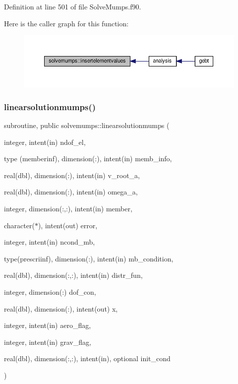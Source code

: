 Definition at line 501 of file Solve\+Mumps.\+f90.

Here is the caller graph for this function\+:\nopagebreak
\begin{figure}[H]
\begin{center}
\leavevmode
\includegraphics[width=350pt]{namespacesolvemumps_a3c8d285942de4048473a98c26d248fd7_icgraph}
\end{center}
\end{figure}
\mbox{\label{namespacesolvemumps_aad7849d30a944c0bd614bf4e103ef494}} 
\subsubsection{\texorpdfstring{linearsolutionmumps()}{linearsolutionmumps()}}
{\footnotesize\ttfamily subroutine, public solvemumps\+::linearsolutionmumps (\begin{DoxyParamCaption}\item[{integer, intent(in)}]{ndof\+\_\+el,  }\item[{type (memberinf), dimension(\+:), intent(in)}]{memb\+\_\+info,  }\item[{real(dbl), dimension(\+:), intent(in)}]{v\+\_\+root\+\_\+a,  }\item[{real(dbl), dimension(\+:), intent(in)}]{omega\+\_\+a,  }\item[{integer, dimension(\+:,\+:), intent(in)}]{member,  }\item[{character($\ast$), intent(out)}]{error,  }\item[{integer, intent(in)}]{ncond\+\_\+mb,  }\item[{type(prescriinf), dimension(\+:), intent(in)}]{mb\+\_\+condition,  }\item[{real(dbl), dimension(\+:,\+:), intent(in)}]{distr\+\_\+fun,  }\item[{integer, dimension(\+:)}]{dof\+\_\+con,  }\item[{real(dbl), dimension(\+:), intent(out)}]{x,  }\item[{integer, intent(in)}]{aero\+\_\+flag,  }\item[{integer, intent(in)}]{grav\+\_\+flag,  }\item[{real(dbl), dimension(\+:,\+:), intent(in), optional}]{init\+\_\+cond }\end{DoxyParamCaption})}



